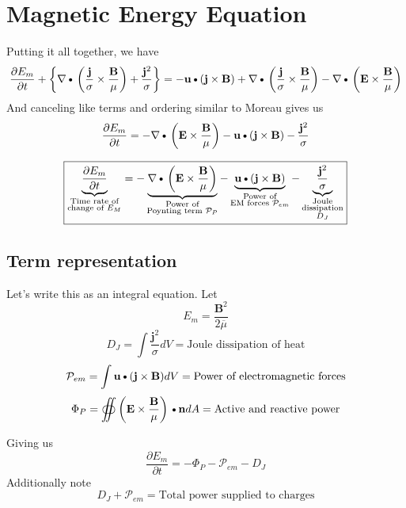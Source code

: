 \documentclass[11pt]{article}
\newcommand{\B}{\mathbf{B}}
\newcommand{\PD}{\partial}
\newcommand{\BM}{\frac{\mathbf{B}}{\mu}}
\newcommand{\J}{\mathbf{j}}
\newcommand{\E}{\mathbf{E}}
\newcommand{\N}{\mathbf{n}}
\newcommand{\JS}{\frac{\mathbf{j}}{\sigma}}
\newcommand{\JSS}{\frac{\mathbf{j}^2}{\sigma}}
\renewcommand{\U}{\mathbf{u}}
\newcommand{\MO}{\overline{\mu}}
\newcommand{\DOT}{\text{\textbullet}}
\begin{document}
\section{Magnetic Energy Equation}
Putting it all together, we have
\begin{equation}
	\frac{\PD E_m}{\PD t} +
	\left\{ \nabla \DOT \left(\JS \times \BM \right) + \JSS \right\} =
	- \U \DOT (\J \times \B) +
	\nabla \DOT \left(\JS \times \BM \right) -
	\nabla \DOT \left(\E \times \BM \right)
\end{equation}
And canceling like terms and ordering similar to Moreau gives us
\begin{equation}
	\frac{\PD E_m}{\PD t} =
	- \nabla \DOT \left(\E \times \BM \right)
	- \U \DOT (\J \times \B)
	- \JSS
\end{equation}

\begin{equation}
	\boxed{
	\underbrace{\frac{\PD E_m}{\PD t} }_
	{\substack{\text{Time rate of}\\\text{change of $E_M$}}}
	=
	- \underbrace{\nabla \DOT \left(\E \times \BM \right)}_
	{\substack{\text{Power of}\\\text{Poynting term $\mathcal P_{P}$}}}
	- \underbrace{\U \DOT (\J \times \B)}_
	{\substack{\text{Power of}\\\text{EM forces $\mathcal P_{em}$}}}
	- \underbrace{\JSS}_
	{\substack{\text{Joule}\\\text{dissipation}\\\text{$D_J$}}}
	}
\end{equation}
\subsection{Term representation}
Let's write this as an integral equation. Let
\begin{equation}
	E_m = \frac{\B^2}{2 \MO}
\end{equation}
\begin{equation}
	D_J = \int \JSS dV = \text{Joule dissipation of heat}
\end{equation}
\begin{equation}
	\mathcal P_{em} = \int \U \DOT (\J \times \B) dV = \text{Power of electromagnetic forces}
\end{equation}
\begin{equation}
	\Phi_P = \oiint \left( \E \times \BM \right) \DOT \N dA = \text{Active and reactive power}
\end{equation}

Giving us
\begin{equation}
	\boxed{
	\frac{\PD E_m}{\PD t}
	=
	- \Phi_P
	- \mathcal P_{em}
	- D_J
	}
\end{equation}
Additionally note
\begin{equation}
	D_J + \mathcal P_{em} = \text{Total power supplied to charges}
\end{equation}
\end{document}
